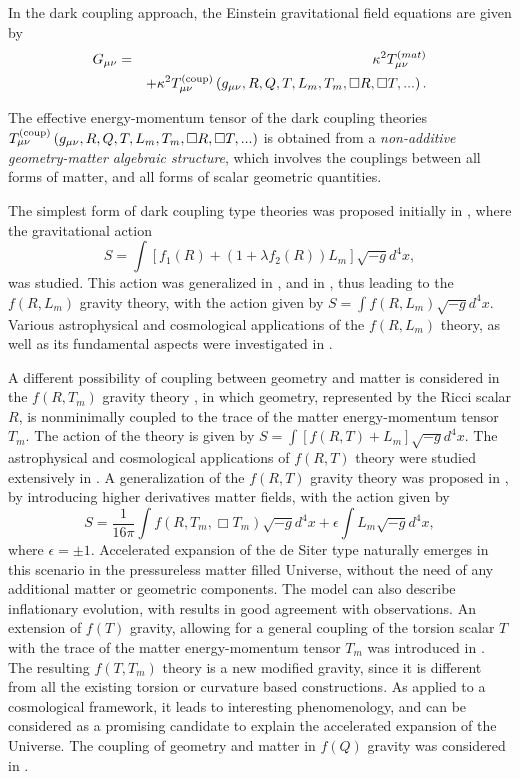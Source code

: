 \documentclass[aps,superscriptaddress, showpacs,preprintnumbers, superscriptaddress, nofootinbibt,twocolumn]{revtex4}
\def\be{\begin{equation}}
\def\ee{\end{equation}}
\def\bea{\begin{eqnarray}}
\def\eea{\end{eqnarray}}
\begin{document}
In the dark coupling approach,  the Einstein gravitational field equations are given by
\bea
G_{\mu \nu}&=&\kappa ^2T_{\mu \nu}^{(mat)}\nonumber\\
&&+\kappa ^2 T_{\mu \nu}^{(\rm coup)}\left(g_{\mu \nu},  R, Q,T,L_m, T_m, \square R, \square T,... \right).\nonumber\\
\eea

The effective energy-momentum tensor of the dark coupling theories $T_{\mu \nu}^{(\rm coup)}\left(g_{\mu \nu}, R, Q, T,L_m, T_m, \square R, \square T,... \right)$ is obtained from a {\it non-additive geometry-matter algebraic structure}, which involves the couplings between all forms of matter, and all forms of scalar geometric quantities.

The simplest form of dark coupling type theories was proposed initially in \cite{fLm1}, where the gravitational action
\be
S=\int{\left[f_1(R)+\left(1+\lambda f_2(R)\right)L_m\right]\sqrt{-g}d^4x},
\ee
was studied. This action was generalized in \cite{fLm2}, and in  \cite{fLm3}, thus leading to the $f\left(R,L_m\right)$ gravity theory, with the action given by $S=\int{f\left(R,L_m\right)\sqrt{-g}d^4x}$. Various astrophysical and cosmological applications of the $f\left(R,L_m\right)$ theory, as well as its fundamental aspects were investigated in \cite{fLm4, fLm5,fLm6,fLm6a, fLm6b, fLm7,fLm8,fLm9,fLm10,fLm11, fLm12}.

 A different possibility of coupling between geometry and matter is considered in the $f(R,T_m)$ gravity theory \cite{fT1}, in which geometry, represented by the Ricci scalar $R$, is nonminimally coupled to the trace of the matter energy-momentum tensor $T_m$.  The action of the theory is given by $S=\int{\left[f\left(R,T\right)+L_m\right]\sqrt{-g}d^4x}$. The astrophysical and cosmological applications of $f(R,T)$ theory were studied extensively in \cite{fT2,fT3,fT4,fT5,fT6,fT7,fT8,fT9,fT10,fT11,fT12,fT12a, fT13,fT13a, fT14, fT14a, fT14b, fT15, fT15a, fT16, fT17, fT18, fT19, fT20, fT21, fT22}. A generalization  of the $f(R,T)$ gravity theory was proposed in \cite{fT23}, by introducing higher derivatives matter fields, with the action given by
 \be
 S=\frac{1}{16\pi}\int{f\left(R,T_m,\Box T_m\right)\sqrt{-g}d^4x}+\epsilon \int{L_m\sqrt{-g}d^4x},
 \ee
 where $\epsilon =\pm 1$. Accelerated expansion of the de Siter type naturally emerges in this scenario in the pressureless matter filled Universe, without the need of any additional matter or geometric components. The model can also describe inflationary evolution, with results in good agreement with observations. An extension of $f(T)$ gravity, allowing for a general coupling of the torsion scalar $T$ with the trace of the matter energy-momentum tensor $T_m$ was introduced in \cite{fTT}. The resulting $f\left(T,T_m\right)$ theory is a new modified gravity, since it is different from all the existing torsion or curvature based constructions. As applied to a cosmological framework, it leads to interesting phenomenology, and can be considered as a promising candidate to explain the accelerated expansion of the Universe. The coupling of geometry and matter in $f(Q)$ gravity was considered in \cite{fQC1,fQC2,fQC3}.
\end{document}
